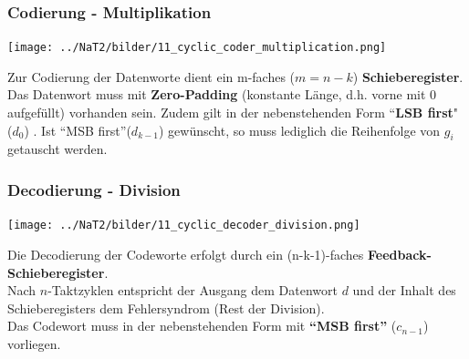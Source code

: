 \subsubsection{Codierung - Multiplikation}
\begin{minipage}{9cm}
	\texttt{[image: ../NaT2/bilder/11\_cyclic\_coder\_multiplication.png]}
\end{minipage}
\begin{minipage}{9.5cm}
	Zur Codierung der Datenworte dient ein m-faches ($m = n-k$) \textbf{Schieberegister}. \\
	Das Datenwort muss mit \textbf{Zero-Padding} (konstante Länge, d.h. vorne mit 0 aufgefüllt) vorhanden sein.
	Zudem gilt in der nebenstehenden Form ``\textbf{LSB first}" ($d_0$) . Ist ``MSB first''($d_{k-1}$) gewünscht, so muss
	lediglich die Reihenfolge von $g_i$ getauscht werden.
\end{minipage}

\subsubsection{Decodierung - Division}
\begin{minipage}{9.4cm}
	\texttt{[image: ../NaT2/bilder/11\_cyclic\_decoder\_division.png]}
\end{minipage}
\begin{minipage}{9cm}
	Die Decodierung der Codeworte erfolgt durch ein (n-k-1)-faches \textbf{Feedback-Schieberegister}.\\
	Nach $n$-Taktzyklen entspricht der Ausgang dem Datenwort $d$ und der Inhalt des Schieberegisters
	dem Fehlersyndrom (Rest der Division). \\ 
	Das Codewort muss in der nebenstehenden Form mit \textbf{``MSB first''} ($c_{n-1}$) vorliegen.
\end{minipage}



